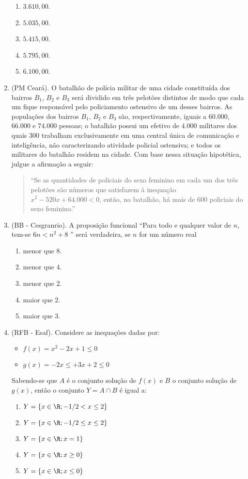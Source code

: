 \begin{enumerate}
\begin{enumerate}
\item $3.610{,}00$.
\item $5.035{,}00$.
\item $5.415{,}00$.
\item $5.795{,}00$.
\item $6.100{,}00$.
\end{enumerate}

\clearpage
\item (PM Ceará). O batalhão de polícia militar de uma cidade constituída dos bairros $B_1$, $B_2$ e $B_3$ será dividido em três pelotões distintos de modo que cada um fique responsável pelo policiamento ostensivo de um desses bairros. As populações dos bairros $B_1$, $B_2$ e $B_3$ são, respectivamente, iguais a $60.000$, $66.000$ e $74.000$ pessoas; o batalhão possui um efetivo de $4.000$ militares dos quais $300$ trabalham exclusivamente em uma central única de comunicação e inteligência, não caracterizando atividade policial ostensiva; e todos os militares do batalhão residem na cidade. Com base nessa situação hipotética, julgue a afirmação a seguir:
\begin{quote}
“Se as quantidades de policiais do sexo feminino em cada um dos três pelotões são números que satisfazem à inequação $x^2 - 520x + 64.000 < 0$, então, no batalhão, há mais de $600$ policiais do sexo feminino.”
\end{quote}

\item (BB - Cesgranrio). A proposição funcional “Para todo e qualquer valor de $n$, tem-se $6n < n^2 + 8$  ” será verdadeira, se $n$ for um número real
\begin{enumerate}
\item menor que $8$.
\item menor que $4$.
\item menor que $2$.
\item maior que $2$.
\item maior que $3$.
\end{enumerate}

\item (RFB - Esaf). Considere as inequações dadas por:
\begin{itemize}
\item $f(x) = x^2 - 2x + 1 \leq 0$
\item $g(x) = -2x\leq + 3x + 2 \leq 0$
\end{itemize}
Sabendo-se que $A$ é o conjunto solução de $f(x)$ e $B$ o conjunto solução de $g(x)$, então o conjunto $Y = A \cap B$ é igual a:
\begin{enumerate}
\item $Y = \{ x \in \R ; -1/2 < x \leq 2 \}$
\item $Y = \{ x \in \R ; -1/2 \leq x \leq 2 \}$
\item $Y = \{ x \in \R ; x = 1 \}$
\item $Y = \{ x \in \R ; x \geq 0 \}$
\item $Y = \{ x \in \R ; x \leq 0 \}$
\end{enumerate}



\end{enumerate}
